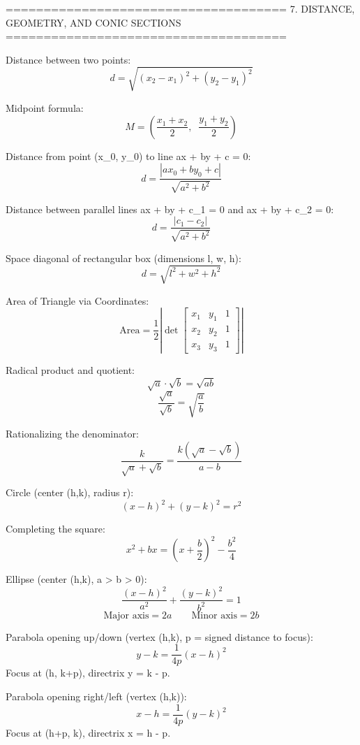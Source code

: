 =====================================
7. DISTANCE, GEOMETRY, AND CONIC SECTIONS
=====================================

Distance between two points:
$$d = \sqrt{(x_2 - x_1)^2 + (y_2 - y_1)^2}$$

Midpoint formula:
$$M = \left( \frac{x_1 + x_2}{2}, \;\; \frac{y_1 + y_2}{2} \right)$$

Distance from point (x_0, y_0) to line ax + by + c = 0:
$$d = \frac{\left| ax_0 + by_0 + c \right|}{\sqrt{a^2 + b^2}}$$

Distance between parallel lines ax + by + c_1 = 0 and ax + by + c_2 = 0:
$$d = \frac{\left| c_1 - c_2 \right|}{\sqrt{a^2 + b^2}}$$

Space diagonal of rectangular box (dimensions l, w, h):
$$d = \sqrt{l^2 + w^2 + h^2}$$

Area of Triangle via Coordinates:
$$\text{Area} = \frac{1}{2} \left| \det \begin{bmatrix} x_1 & y_1 & 1 \\ x_2 & y_2 & 1 \\ x_3 & y_3 & 1 \end{bmatrix} \right|$$

Radical product and quotient:
$$\sqrt{a} \cdot \sqrt{b} = \sqrt{ab}$$
$$\frac{\sqrt{a}}{\sqrt{b}} = \sqrt{\frac{a}{b}}$$

Rationalizing the denominator:
$$\frac{k}{\sqrt{a} + \sqrt{b}} = \frac{k\left(\sqrt{a} - \sqrt{b}\right)}{a - b}$$

Circle (center (h,k), radius r):
$$(x - h)^2 + (y - k)^2 = r^2$$

Completing the square:
$$x^2 + bx = \left( x + \frac{b}{2} \right)^2 - \frac{b^2}{4}$$

Ellipse (center (h,k), a > b > 0):
$$\frac{(x-h)^2}{a^2} + \frac{(y-k)^2}{b^2} = 1$$
$$\text{Major axis} = 2a \qquad \text{Minor axis} = 2b$$

Parabola opening up/down (vertex (h,k), p = signed distance to focus):
$$y - k = \frac{1}{4p}(x - h)^2$$
Focus at (h, k+p), directrix y = k - p.

Parabola opening right/left (vertex (h,k)):
$$x - h = \frac{1}{4p}(y - k)^2$$
Focus at (h+p, k), directrix x = h - p.
